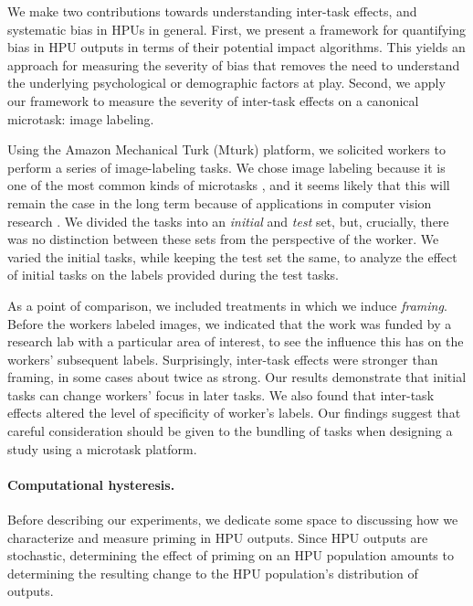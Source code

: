 \documentclass[12pt]{article}
\begin{document}
We make two contributions towards understanding inter-task effects,
and systematic bias in HPUs in general.  First, we present a framework for 
quantifying bias in HPU outputs in terms of their potential impact 
algorithms.  This yields an approach for measuring the severity of bias 
that removes the need to understand the underlying psychological or 
demographic factors at play.  Second, we apply our framework to measure the
severity of inter-task effects on a canonical microtask: image labeling.

Using the  Amazon Mechanical Turk (Mturk) platform, we solicited workers to 
perform a series of image-labeling tasks.  We chose image labeling because it 
is one of the most common kinds of microtasks
\cite{chandler2013breaking,Berinsky2012351,Finnerty2013,paolacci2010running}, 
and it seems likely that this will remain the case in the long term because
of applications in computer vision research \cite{5543192}.
We divided the tasks into an \textit{initial} and \textit{test} set, 
but, crucially, there was no distinction between these sets from the
perspective of the worker.  We varied the initial tasks, while 
keeping the test set the same, to analyze the effect of initial tasks on 
the labels provided during the test tasks.

As a point of comparison, we included treatments in which we induce 
\textit{framing}.
Before the workers labeled images, we indicated that the work 
was funded by a research lab with a particular area of interest, to see the 
influence this has on the workers’ subsequent labels. 
Surprisingly, inter-task effects were stronger than framing, in some cases 
about twice as strong. 
Our results demonstrate that initial tasks can change workers' focus in later 
tasks.  We also found that inter-task effects altered the level of specificity 
of worker's labels.  Our findings suggest that careful consideration should be 
given to the bundling of tasks when designing a study using a microtask 
platform.

\paragraph*{Computational hysteresis.}
Before describing our experiments, we dedicate some space to discussing
how we characterize and measure priming in HPU outputs.  Since HPU outputs are
stochastic, determining the effect of priming on an HPU population
amounts to determining the resulting change to the HPU population's 
distribution of outputs. 
\end{document}

